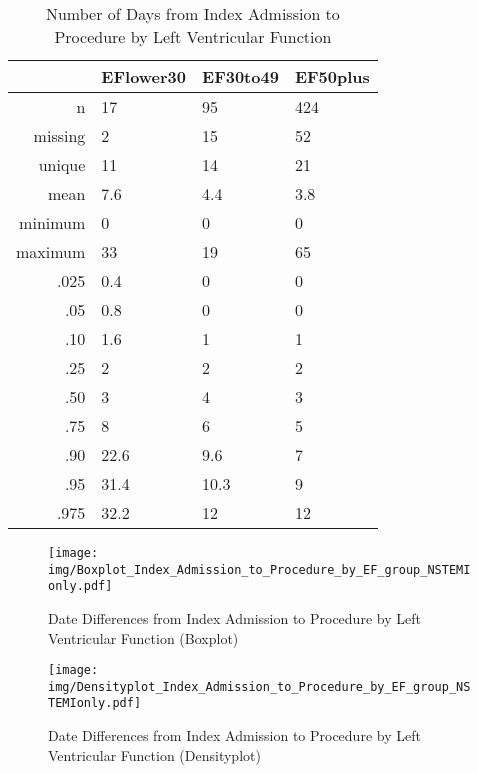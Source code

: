 \documentclass[a4paper]{report}
\begin{document}
\begin{itemize}
{%
\begin{table}[ht]
\centering
\begin{tabular}{rlll}
  \toprule
 & EFlower30 & EF30to49 & EF50plus \\ 
  \midrule
n & 17 & 95 & 424 \\ 
  missing & 2 & 15 & 52 \\ 
  unique & 11 & 14 & 21 \\ 
  mean & 7.6 & 4.4 & 3.8 \\ 
  minimum & 0 & 0 & 0 \\ 
  maximum & 33 & 19 & 65 \\ 
  .025 & 0.4 & 0 & 0 \\ 
  .05 & 0.8 & 0 & 0 \\ 
  .10 & 1.6 & 1 & 1 \\ 
  .25 & 2 & 2 & 2 \\ 
  .50 & 3 & 4 & 3 \\ 
  .75 & 8 & 6 & 5 \\ 
  .90 & 22.6 & 9.6 & 7 \\ 
  .95 & 31.4 & 10.3 & 9 \\ 
  .975 & 32.2 & 12 & 12 \\ 
   \bottomrule
\end{tabular}
\caption{Number of Days from Index Admission to Procedure by Left Ventricular Function} 
\end{table}
\begin{figure}
  \centering
  \caption{Date Differences from Index Admission to Procedure by Left Ventricular Function (Boxplot)}
  \label{Boxplot: Date Differences from Index Admission to Procedure by Left Ventricular Function}
\texttt{[image: img/Boxplot\_Index\_Admission\_to\_Procedure\_by\_EF\_group\_NSTEMIonly.pdf]}\end{figure}


\begin{figure}
  \centering
  \caption{Date Differences from Index Admission to Procedure by Left Ventricular Function (Densityplot)}
  \label{Density: Date Differences from Index Admission to Procedure by Left Ventricular Function}
\texttt{[image: img/Densityplot\_Index\_Admission\_to\_Procedure\_by\_EF\_group\_NSTEMIonly.pdf]}\end{figure}



\clearpage

}
\end{itemize}
\end{document}
